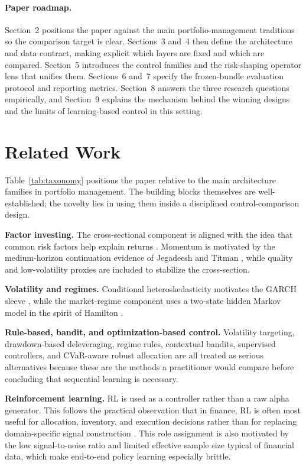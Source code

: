 \documentclass[10pt,twocolumn]{article}
\begin{document}
\paragraph{Paper roadmap.}
Section~2 positions the paper against the main portfolio-management traditions
so the comparison target is clear. Sections~3 and~4 then define the architecture
and data contract, making explicit which layers are fixed and which are
compared. Section~5 introduces the control families and the risk-shaping
operator lens that unifies them. Sections~6 and~7 specify the frozen-bundle
evaluation protocol and reporting metrics. Section~8 answers the three research
questions empirically, and Section~9 explains the mechanism behind the winning
designs and the limits of learning-based control in this setting.

\section{Related Work}

Table~\ref{tab:taxonomy} positions the paper relative to the main architecture
families in portfolio management. The building blocks themselves are
well-established; the novelty lies in using them inside a disciplined
control-comparison design.

\textbf{Factor investing.} The cross-sectional component is aligned with the idea
that common risk factors help explain returns \cite{fama1993}. Momentum is
motivated by the medium-horizon continuation evidence of Jegadeesh and Titman
\cite{jegadeesh1993}, while quality and low-volatility proxies are included to
stabilize the cross-section.

\textbf{Volatility and regimes.} Conditional heteroskedasticity motivates the
GARCH sleeve \cite{engle1982,bollerslev1986}, while the market-regime component
uses a two-state hidden Markov model in the spirit of Hamilton \cite{hamilton1989}.

\textbf{Rule-based, bandit, and optimization-based control.} Volatility
targeting, drawdown-based deleveraging, regime rules, contextual bandits,
supervised controllers, and CVaR-aware robust allocation are all treated as
serious alternatives because these are the methods a practitioner would compare
before concluding that sequential learning is necessary.

\textbf{Reinforcement learning.} RL is used as a controller rather than a raw
alpha generator. This follows the practical observation that in finance, RL is
often most useful for allocation, inventory, and execution decisions rather than
for replacing domain-specific signal construction \cite{sutton2018,almgren2000}.
This role assignment is also motivated by the low signal-to-noise ratio and
limited effective sample size typical of financial data, which make end-to-end
policy learning especially brittle.
\end{document}
